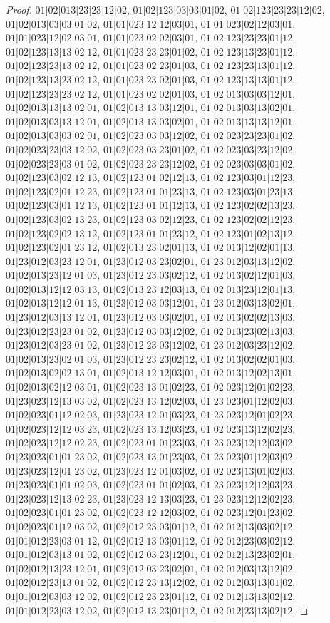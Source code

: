 \documentclass[12pt]{article}
\theoremstyle{plain}
\theoremstyle{definition}
\theoremstyle{remark}
\begin{document}
\begin{proof}
$01|02|013|23|23|12|02$, $01|02|123|03|03|01|02$, $01|02|123|23|23|12|02$, $01|02|013|03|03|01|02$, $01|01|023|12|12|03|01$, $01|01|023|02|12|03|01$, $01|01|023|12|02|03|01$, $01|01|023|02|02|03|01$, $01|02|123|23|23|01|12$, $01|02|123|13|13|02|12$, $01|01|023|23|23|01|02$, $01|02|123|13|23|01|12$, $01|02|123|23|13|02|12$, $01|01|023|02|23|01|03$, $01|02|123|23|13|01|12$, $01|02|123|13|23|02|12$, $01|01|023|23|02|01|03$, $01|02|123|13|13|01|12$, $01|02|123|23|23|02|12$, $01|01|023|02|02|01|03$, $01|02|013|03|03|12|01$, $01|02|013|13|13|02|01$, $01|02|013|13|03|12|01$, $01|02|013|03|13|02|01$, $01|02|013|03|13|12|01$, $01|02|013|13|03|02|01$, $01|02|013|13|13|12|01$, $01|02|013|03|03|02|01$, $01|02|023|03|03|12|02$, $01|02|023|23|23|01|02$, $01|02|023|23|03|12|02$, $01|02|023|03|23|01|02$, $01|02|023|03|23|12|02$, $01|02|023|23|03|01|02$, $01|02|023|23|23|12|02$, $01|02|023|03|03|01|02$, $01|02|123|03|02|12|13$, $01|02|123|01|02|12|13$, $01|02|123|03|01|12|23$, $01|02|123|02|01|12|23$, $01|02|123|01|01|23|13$, $01|02|123|03|01|23|13$, $01|02|123|03|01|12|13$, $01|02|123|01|01|12|13$, $01|02|123|02|02|13|23$, $01|02|123|03|02|13|23$, $01|02|123|03|02|12|23$, $01|02|123|02|02|12|23$, $01|02|123|02|02|13|12$, $01|02|123|01|01|23|12$, $01|02|123|01|02|13|12$, $01|02|123|02|01|23|12$, $01|02|013|23|02|01|13$, $01|02|013|12|02|01|13$, $01|23|012|03|23|12|01$, $01|23|012|03|23|02|01$, $01|23|012|03|13|12|02$, $01|02|013|23|12|01|03$, $01|23|012|23|03|02|12$, $01|02|013|02|12|01|03$, $01|02|013|12|12|03|13$, $01|02|013|23|12|03|13$, $01|02|013|23|12|01|13$, $01|02|013|12|12|01|13$, $01|23|012|03|03|12|01$, $01|23|012|03|13|02|01$, $01|23|012|03|13|12|01$, $01|23|012|03|03|02|01$, $01|02|013|02|02|13|03$, $01|23|012|23|23|01|02$, $01|23|012|03|03|12|02$, $01|02|013|23|02|13|03$, $01|23|012|03|23|01|02$, $01|23|012|23|03|12|02$, $01|23|012|03|23|12|02$, $01|02|013|23|02|01|03$, $01|23|012|23|23|02|12$, $01|02|013|02|02|01|03$, $01|02|013|02|02|13|01$, $01|02|013|12|12|03|01$, $01|02|013|12|02|13|01$, $01|02|013|02|12|03|01$, $01|02|023|13|01|02|23$, $01|02|023|12|01|02|23$, $01|23|023|12|13|03|02$, $01|02|023|13|12|02|03$, $01|23|023|01|12|02|03$, $01|02|023|01|12|02|03$, $01|23|023|12|01|03|23$, $01|23|023|12|01|02|23$, $01|02|023|12|12|03|23$, $01|02|023|13|12|03|23$, $01|02|023|13|12|02|23$, $01|02|023|12|12|02|23$, $01|02|023|01|01|23|03$, $01|23|023|12|12|03|02$, $01|23|023|01|01|23|02$, $01|02|023|13|01|23|03$, $01|23|023|01|12|03|02$, $01|23|023|12|01|23|02$, $01|23|023|12|01|03|02$, $01|02|023|13|01|02|03$, $01|23|023|01|01|02|03$, $01|02|023|01|01|02|03$, $01|23|023|12|12|03|23$, $01|23|023|12|13|02|23$, $01|23|023|12|13|03|23$, $01|23|023|12|12|02|23$, $01|02|023|01|01|23|02$, $01|02|023|12|12|03|02$, $01|02|023|12|01|23|02$, $01|02|023|01|12|03|02$, $01|02|012|23|03|01|12$, $01|02|012|13|03|02|12$, $01|01|012|23|03|01|12$, $01|02|012|13|03|01|12$, $01|02|012|23|03|02|12$, $01|01|012|03|13|01|02$, $01|02|012|03|23|12|01$, $01|02|012|13|23|02|01$, $01|02|012|13|23|12|01$, $01|02|012|03|23|02|01$, $01|02|012|03|13|12|02$, $01|02|012|23|13|01|02$, $01|02|012|23|13|12|02$, $01|02|012|03|13|01|02$, $01|01|012|03|03|12|02$, $01|02|012|23|23|01|12$, $01|02|012|13|13|02|12$, $01|01|012|23|03|12|02$, $01|02|012|13|23|01|12$, $01|02|012|23|13|02|12$, 
\end{proof}
\end{document}
